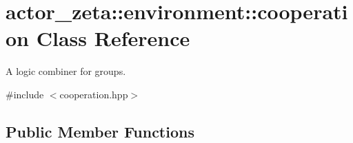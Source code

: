 \hypertarget{classactor__zeta_1_1environment_1_1cooperation}{}\section{actor\+\_\+zeta\+:\+:environment\+:\+:cooperation Class Reference}
\label{classactor__zeta_1_1environment_1_1cooperation}


A logic combiner for groups.  




{\ttfamily \#include $<$cooperation.\+hpp$>$}

\subsection*{Public Member Functions}
